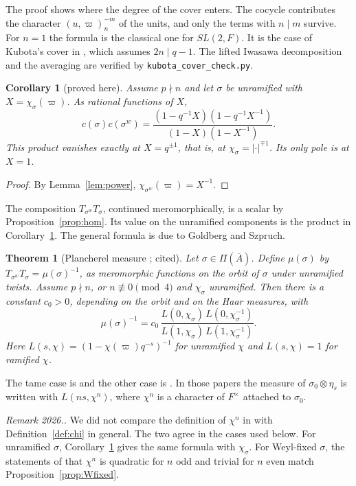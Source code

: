 \documentclass[12pt,letterpaper]{article}
\numberwithin{equation}{section}
\newtheorem{xtheorem}[theorem]{Theorem}
\newtheorem{xcorollary}[theorem]{Corollary}
\theoremstyle{definition}
\newcounter{rmk}
\newcommand{\unverified}[1]{\refstepcounter{rmk}\par\smallskip\noindent\textit{Remark 2026.\arabic{rmk}.} #1\par\smallskip}
\newcommand{\proved}{proved here}
\newcommand{\cited}{cited}
\newcommand{\vp}{\varpi}
\newcommand{\bA}{\overline{A}}
\begin{document}
The proof shows where the degree of the cover enters.  The cocycle contributes the
character $(u,\vp)_n^{-m}$ of the units, and only the terms with $n\mid m$ survive.  For
$n=1$ the formula is the classical one for $SL(2,F)$.  It is the case of Kubota's cover in
\cite[Theorem~7.5]{Mc12}, which assumes $2n\mid q-1$.  The lifted Iwasawa decomposition
and the averaging are verified by \texttt{kubota\_cover\_check.py}.

\begin{xcorollary}[\proved]\label{cor:c-product}
Assume $p\nmid n$ and let $\sigma$ be unramified with $X=\chi_\sigma(\vp)$.  As rational
functions of $X$,
\[
c(\sigma)c(\sigma^w)=\frac{(1-q^{-1}X)(1-q^{-1}X^{-1})}{(1-X)(1-X^{-1})}.
\]
This product vanishes exactly at $X=q^{\pm1}$, that is, at $\chi_\sigma=|\cdot|^{\mp1}$.  Its
only pole is at $X=1$.
\end{xcorollary}
\begin{proof}
By Lemma~\ref{lem:power}, $\chi_{\sigma^w}(\vp)=X^{-1}$.
\end{proof}

The composition $T_{\sigma^w}T_\sigma$, continued meromorphically, is a scalar by
Proposition~\ref{prop:hom}.  Its value on the unramified components is the product in
Corollary~\ref{cor:c-product}.  The general formula is due to Goldberg and Szpruch.

\begin{xtheorem}[Plancherel measure \cite{GS16,Sz19}; \cited]\label{thm:plancherel}
Let $\sigma\in\Pi(\bA)$.  Define $\mu(\sigma)$ by
$T_{\sigma^w}T_\sigma=\mu(\sigma)^{-1}$, as meromorphic functions on the orbit of $\sigma$
under unramified twists.  Assume $p\nmid n$, or $n\not\equiv0\pmod4$ and $\chi_\sigma$
unramified.  Then there is a constant $c_0>0$, depending on the orbit and on the Haar
measures, with
\[
\mu(\sigma)^{-1}=c_0\,\frac{L(0,\chi_\sigma)\,L(0,\chi_\sigma^{-1})}{L(1,\chi_\sigma)\,L(1,\chi_\sigma^{-1})}.
\]
Here $L(s,\chi)=(1-\chi(\vp)q^{-s})^{-1}$ for unramified $\chi$ and $L(s,\chi)=1$ for
ramified $\chi$.
\end{xtheorem}
The tame case is \cite[Theorem~5.1]{GS16} and the other case is \cite[Theorem~5.7]{Sz19}.
In those papers the measure of $\sigma_0\otimes\eta_s$ is written with $L(ns,\chi^n)$,
where $\chi^n$ is a character of $F^\times$ attached to $\sigma_0$.

\unverified{We did not compare the definition of $\chi^n$ in \cite{GS16,Sz19} with
Definition~\ref{def:chi} in general.  The two agree in the cases used below.  For
unramified $\sigma$, Corollary~\ref{cor:c-product} gives the same formula with
$\chi_\sigma$.  For Weyl-fixed $\sigma$, the statements of \cite{GS16,Sz19,Sz24} that
$\chi^n$ is quadratic for $n$ odd and trivial for $n$ even match
Proposition~\ref{prop:Wfixed}.}
\end{document}
